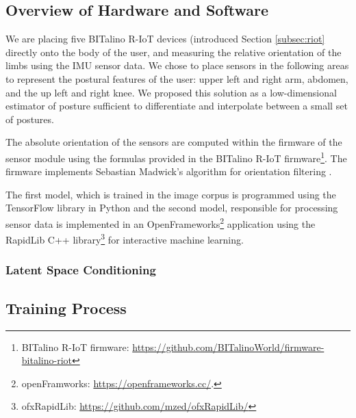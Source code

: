 \subsection{Overview of Hardware and Software}

We are placing five BITalino R-IoT devices (introduced Section \ref{subsec:riot} directly onto the body of the user, and measuring the relative orientation of the limbs using the IMU sensor data. We chose to place sensors in the following areas to represent the postural features of the user: upper left and right arm, abdomen, and the up left and right knee. We proposed this solution as a low-dimensional estimator of posture sufficient to differentiate and interpolate between a small set of postures.


The absolute orientation of the sensors are computed within the firmware of the sensor module using the formulas provided in the BITalino R-IoT firmware\footnote{BITalino R-IoT firmware: \url{https://github.com/BITalinoWorld/firmware-bitalino-riot}}. The firmware implements Sebastian Madwick’s algorithm for orientation filtering \cite{madgwick_ecient_nodate}.

The first model, which is trained in the image corpus is programmed using the TensorFlow library \cite{abadi_tensorflow_2016} in Python and the second model, responsible for processing sensor data is implemented in an OpenFrameworks\footnote{openFramworks: \url{https://openframeworks.cc/}.} application using the RapidLib C++ library\footnote{ofxRapidLib: \url{https://github.com/mzed/ofxRapidLib/}} for interactive machine learning.

\subsubsection{Latent Space Conditioning}



\subsection{Training Process}
\label{training_process}

